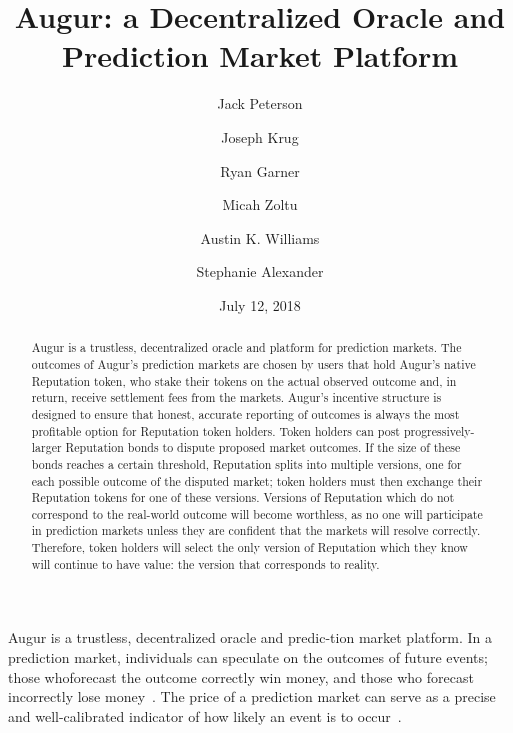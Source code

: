 \documentclass[12pt,floatfix,reprint,nofootinbib,amsmath,amssymb,epsfig,pre,floats,letterpaper,groupedaffiliation]{revtex4-1}
\theoremstyle{definition}
\theoremstyle{definition}
\begin{document}
\flushbottom


\title{Augur: a Decentralized Oracle and Prediction Market Platform}

\author{Jack Peterson}
\author{Joseph Krug}
\author{Ryan Garner}
\author{Micah Zoltu}
\author{Austin K. Williams}
\author{Stephanie Alexander}
\date{July 12, 2018}

\begin{abstract}

\vspace{0pt plus 20pt}
Augur is a trustless, decentralized oracle and platform for prediction markets. The outcomes of Augur's prediction markets are chosen by users that hold Augur's native Reputation token, who stake their tokens on the actual observed outcome and, in return, receive settlement fees from the markets. Augur's incentive structure is designed to ensure that honest, accurate reporting of outcomes is always the most profitable option for Reputation token holders. Token holders can post progressively-larger Reputation bonds to dispute proposed market outcomes. If the size of these bonds reaches a certain threshold, Reputation splits into multiple versions, one for each possible outcome of the disputed market; token holders must then exchange their Reputation tokens for one of these versions. Versions of Reputation which do not correspond to the real-world outcome will become worthless, as no one will participate in prediction markets unless they are confident that the markets will resolve correctly. Therefore, token holders will select the only version of Reputation which they know will continue to have value: the version that corresponds to reality.
\end{abstract}

\maketitle

Augur is a trustless, decentralized oracle and predic-\linebreak tion market platform. In a prediction market, \mbox{individuals} can speculate on the outcomes of future events; those who\linebreak forecast the outcome correctly win money, and those who forecast incorrectly lose money~\cite{Wolfers_2004,Surowiecki_2005,Hanson_2006}. The price of a prediction market can serve as a precise and well-calibrated indicator of how likely an event is to occur~\cite{Pennock_2001,Manski_2004,Wolfers_2005,Goel_2010}.
\end{document}
